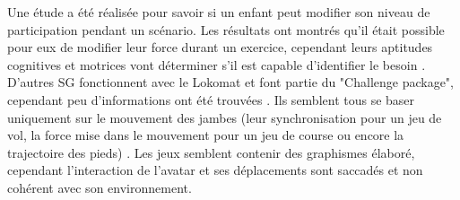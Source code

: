 		Une étude a été réalisée pour savoir si un enfant peut modifier son niveau de participation pendant un scénario. Les résultats ont montrés qu'il était possible pour eux de modifier leur force durant un exercice, cependant leurs aptitudes cognitives et motrices vont déterminer s'il est capable d'identifier le besoin \cite{Labruyere_LokomatGabarello}.
		\\
		
		D'autres SG fonctionnent avec le Lokomat et font partie du "Challenge package", cependant peu d'informations ont été trouvées \cite{Lokomat_Brochure}. Ils semblent tous se baser uniquement sur le mouvement des jambes (leur synchronisation pour un jeu de vol, la force mise dans le mouvement pour un jeu de course ou encore la trajectoire des pieds) \cite{Lokomat_FlyingGame}. Les jeux semblent contenir des graphismes élaboré, cependant l'interaction de l'avatar et ses déplacements sont saccadés et non cohérent avec son environnement. %
		
		
